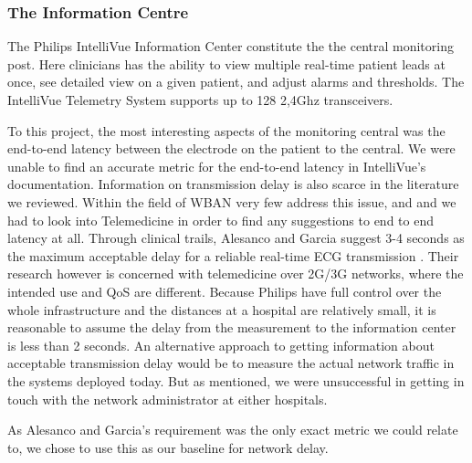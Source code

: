 
\subsubsection{The Information Centre} %
\label{ssub:the_information_centre}

The Philips IntelliVue Information Center constitute the the central monitoring post. Here clinicians has the ability to view multiple real-time patient leads at once, see detailed view on a given patient, and adjust alarms and thresholds. The IntelliVue Telemetry System supports up to 128 2,4Ghz transceivers.



To this project, the most interesting aspects of the monitoring central was the end-to-end latency between the electrode on the patient to the central. We were unable to find an accurate metric for the end-to-end latency in IntelliVue's documentation. Information on transmission delay is also scarce in the literature we reviewed. Within the field of WBAN very few address this issue, and and we had to look into Telemedicine in order to find any suggestions to end to end latency at all. Through clinical trails, Alesanco and Garcia suggest 3-4 seconds as the maximum acceptable delay for a reliable real-time ECG transmission \cite{Alesanco:2010kc}. Their research however is concerned with telemedicine over 2G/3G networks, where the intended use and QoS are different. 
Because Philips have full control over the whole infrastructure and the distances at a hospital are relatively small, it is reasonable to assume the delay from the measurement to the information center is less than 2 seconds. An alternative approach to getting information about acceptable transmission delay would be to measure the actual network traffic in the systems deployed today. But as mentioned, we were unsuccessful in getting in touch with the network administrator at either hospitals.

As Alesanco and Garcia's requirement was the only exact metric we could relate to, we chose to use this as our baseline for network delay.

